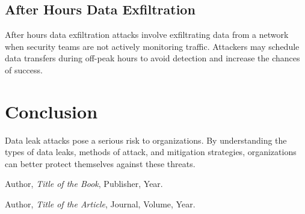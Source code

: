 \documentclass{article}
\begin{document}
\subsection{After Hours Data Exfiltration}
After hours data exfiltration attacks involve exfiltrating data from a network when security teams are not actively monitoring traffic. Attackers may schedule data transfers during off-peak hours to avoid detection and increase the chances of success.



\section{Conclusion}
Data leak attacks pose a serious risk to organizations. By understanding the types of data leaks, methods of attack, and mitigation strategies, organizations can better protect themselves against these threats.

\begin{thebibliography}{9}
Author, \emph{Title of the Book}, Publisher, Year.

Author, \emph{Title of the Article}, Journal, Volume, Year.
\end{thebibliography}
\end{document}
